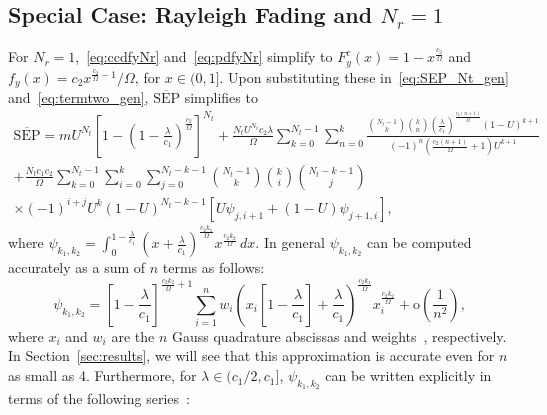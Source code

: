 \documentclass[12pt,draftcls,peerreview,onecolumn]{IEEEtran}
\newcommand{\SEP}{\text{SEP}}
\newcommand{\nck}[2]{\binom{#1}{#2}}
\newcommand{\lam}{\lambda}
\newcommand{\Nt}{{N_t}}
\newcommand{\Nr}{{N_r}}
\newcommand{\cone}{c_{1}}
\newcommand{\ctwo}{c_{2}}
\newcommand{\m}{\cone}
\newcommand{\lambym}{\frac{\lam}{\m}}
\newcommand{\al}{\ctwo}
\newcommand{\snr}{\Omega}
\newcommand{\albysnr}[1][]{\frac{\al#1}{\snr}}
\newcommand{\un}{U}
\newcommand{\psifun}[2]{\psi_{{#1},{#2}}}
\newcommand{\onemlc}{\left[1-\lambym\right]}
\newcommand{\zerosep}{m}
\newcommand{\avgSEP}{\overline{\SEP}}
\newcommand{\akone}{\albysnr[k_1]}
\newcommand{\lidx}{j}
\begin{document}
\subsection{Special Case: Rayleigh Fading and $\Nr=1$} 
For $\Nr=1$,~\eqref{eq:ccdfyNr} and~\eqref{eq:pdfyNr} simplify to $F_{y}^{c}(x) = 1-x^{\albysnr}$ and $f_{y}(x) = \al x^{\albysnr-1}/\snr$, for $x \in (0,1]$. Upon substituting these in~\eqref{eq:SEP_Nt_gen} and~\eqref{eq:termtwo_gen},  $\avgSEP$ simplifies to 
%
\begin{multline}
\label{eq:avgSEPoneNr} 
\avgSEP =\zerosep\un^{\Nt}\!\left[1-\left(1-\lambym\right)^{\!\albysnr[]}\right]^{\Nt}
+ \frac{\Nt\un^{\Nt}\al\lam}{\snr} \sum_{k=0}^{\Nt-1}\sum_{n=0}^{k} \frac{\nck{\Nt-1}{k} \nck{k}{n}\left(\lambym\right)^{\albysnr[(n+1)]}\left(1-\un\right)^{k+1} }{(-1)^{n} \left( \albysnr[(n+1)]+1\right)\un^{k+1} }\\ + \frac{\Nt\m\al}{\snr} \sum_{k=0}^{\Nt-1} \sum_{i=0}^{k} \sum_{j=0}^{\Nt-k-1} \binom{\Nt-1}{k} \binom{k}{i} \binom{\Nt-k-1}{j} \\\times(-1)^{i+j} \un^{k} (1-\un)^{\Nt-k-1} \left[ \un\psifun{j}{i+1} +  \left(1-\un\right) \psifun{j+1}{i} \right]
,
\end{multline}
where $\psifun{k_1}{k_2} = \int_{0}^{1-\frac{\lam}{\m}} \left(x+\lambym\right)^{\albysnr[k_1]} x^{\albysnr[k_2]} \,dx$.
%
In general $\psifun{k_1}{k_2}$ can be computed accurately as a sum of $n$  terms as follows: 
\begin{equation}
\psifun{k_1}{k_2} ={\onemlc^{\albysnr[k_2]+1}} \sum_{i=1}^{n} w_{i} {\left(\!x_i\onemlc +\lambym\right)}^{\albysnr[k_1]} x_i^{\albysnr[k_2]} + \text{o}\left(\frac{1}{n^2}\!\right),
\label{eq:gauss_quad}
\end{equation}
where $x_i$ and $w_i$ are the $n$ Gauss quadrature abscissas and weights~\cite{abramowitz_stegun}, respectively. In Section~\ref{sec:results}, we will see that this approximation is accurate even for $n$ as small as 4. Furthermore, for $\lam\in({\m}/{2}, \m]$, $\psifun{k_1}{k_2}$ can be written explicitly in terms of the following series~\cite{gradshteyn00_book}:
%
\end{document}
